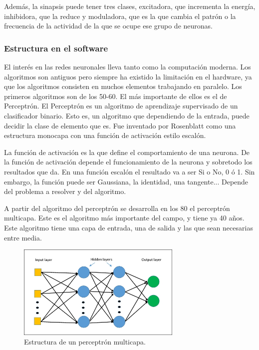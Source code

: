 \documentclass[12pt]{article}
\numberwithin{equation}{section}
\begin{document}
{Además, la sinapsis puede tener tres clases, excitadora, que incrementa la energía, 	inhibidora, que la reduce y moduladora, que es la que cambia el patrón o la frecuencia de la actividad de la que se ocupe ese grupo de neuronas. 

\subsubsection{Estructura en el software}

El interés en las redes neuronales lleva tanto como la computación moderna. Los algoritmos son antiguos pero siempre ha existido la limitación en el hardware, ya que los algoritmos consisten en muchos elementos trabajando en paralelo. Los primeros algoritmos son de los 50-60. El más importante de ellos es el de Perceptrón. El Perceptrón es un algoritmo de aprendizaje supervisado de un clasificador binario. Esto es, un algoritmo que dependiendo de la entrada, puede decidir la clase de elemento que es. Fue inventado por Rosenblatt como una estructura monocapa con una función de activación estilo escalón.

La función de activación es la que define el comportamiento de una neurona. De la función de activación depende el funcionamiento de la neurona y sobretodo los resultados que da. En una función escalón el resultado va a ser Si o No, 0 ó 1. Sin embargo, la función puede ser Gaussiana, la identidad, una tangente... Depende del problema a resolver y del algoritmo.

A partir del algoritmo del perceptrón se desarrolla en los 80 el perceptrón multicapa. Este es el algoritmo más importante del campo, y tiene ya 40 años. Este algoritmo tiene una capa de entrada, una de salida y las que sean necesarias entre media.

\begin{figure}[h]
    \centering
    \includegraphics[width=0.7\textwidth]{multicapa.jpg}
    \caption{Estructura de un perceptrón multicapa.}
    \label{fig:estructuraneurona}
\end{figure}

}
\end{document}
